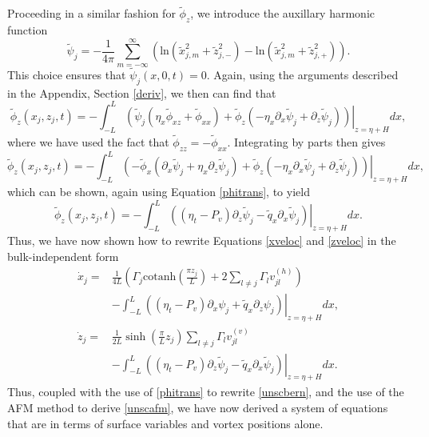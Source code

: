 \documentclass[a4paper,11pt]{article}
\newcommand{\p}{\partial}
\begin{document}
Proceeding in a similar fashion for $\tilde{\phi}_{z}$, we introduce the auxillary harmonic function
\[
\tilde{\psi}_{j} = -\frac{1}{4\pi}\sum_{m=-\infty}^{\infty} \left( \mbox{ln}\left( \tilde{x}_{j,m}^{2} + \tilde{z}_{j,-}^{2}  \right) - \mbox{ln}\left( \tilde{x}_{j,m}^{2} + \tilde{z}_{j,+}^{2} \right)\right).
\]
This choice ensures that $\tilde{\psi}_{j}(x,0,t) = 0$.  Again, using the arguments described in the Appendix, Section \ref{deriv}, we then can find that
\[
\tilde{\phi}_{z}(x_{j},z_{j},t) = -\int_{-L}^{L}\left.\left( \tilde{\psi}_{j}\left(\eta_{x}\tilde{\phi}_{xz}+\tilde{\phi}_{xx}\right)+\tilde{\phi}_{z}\left(-\eta_{x}\p_{x}\tilde{\psi}_{j}+\p_{z}\tilde{\psi}_{j}\right) \right)\right|_{z=\eta+H} dx ,
\]
where we have used the fact that $\tilde{\phi}_{zz} = -\tilde{\phi}_{xx}$.  Integrating by parts then gives 
\[
\tilde{\phi}_{z}(x_{j},z_{j},t) = -\int_{-L}^{L}\left.\left(-\tilde{\phi}_{x}\left(\p_{x} \tilde{\psi}_{j} + \eta_{x}\p_{z} \tilde{\psi}_{j}\right) +\tilde{\phi}_{z}\left(-\eta_{x}\p_{x} \tilde{\psi}_{j}+\p_{z}\tilde{\psi}_{j}\right)\right)\right|_{z=\eta+H}dx,
\]
which can be shown, again using Equation \eqref{phitrans}, to yield
\[
\tilde{\phi}_{z}(x_{j},z_{j},t) = -\int_{-L}^{L}\left.\left( \left(\eta_{t}-P_{v}\right)\p_{z}\tilde{\psi}_{j} - \tilde{q}_{x}\p_{x}\tilde{\psi}_{j} \right)\right|_{z=\eta+H} dx.
\]
Thus, we have now shown how to rewrite Equations \eqref{xveloc} and \eqref{zveloc} in the bulk-independent form 
\begin{align}
\dot{x}_{j} = & \frac{1}{4L}\left(  \Gamma_{j}\mbox{cotanh}\left(\frac{\pi z_{j}}{L} \right)+2\sum_{l\neq j}\Gamma_{l}v_{jl}^{(h)} \right)\nonumber\\
&  -\int_{-L}^{L}\left.\left(\left(\eta_{t}-P_{v}\right)\p_{x}\psi_{j} + \tilde{q}_{x}\p_{z}\psi_{j} \right)\right|_{z=\eta + H} dx, \label{xdotb}\\
\dot{z}_{j} = &  \frac{1}{2L}\sinh\left(\frac{\pi}{L}z_{j}\right)\sum_{l\neq j} \Gamma_{l} v_{jl}^{(v)}\nonumber\\
& - \int_{-L}^{L}\left.\left( \left(\eta_{t}-P_{v}\right)\p_{z}\tilde{\psi}_{j} - \tilde{q}_{x}\p_{x}\tilde{\psi}_{j} \right)\right|_{z=\eta + H} dx. \label{zdotb}
\end{align}
Thus, coupled with the use of \eqref{phitrans} to rewrite \eqref{unscbern}, and the use of the AFM method to derive \eqref{unscafm}, we have now derived a system of equations that are in terms of surface variables and vortex positions alone.  
\end{document}

